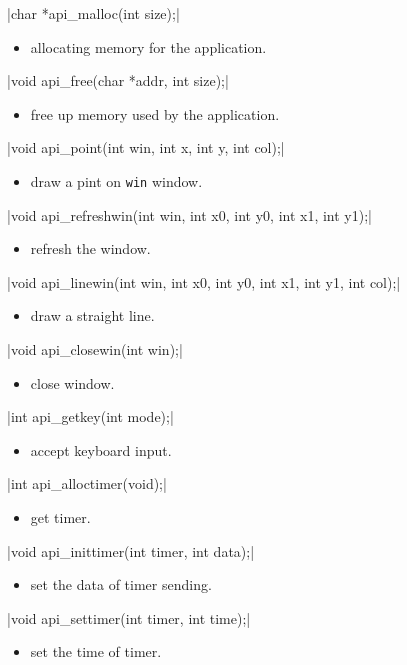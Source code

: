 \documentclass{swfcthesis}
\begin{document}
\csingle|char *api_malloc(int size);|
\begin{itemize}
\item allocating memory for the application.
\end{itemize}

\csingle|void api_free(char *addr, int size);|
\begin{itemize}
\item free up memory used by the application.
\end{itemize}

\csingle|void api_point(int win, int x, int y, int col);|
\begin{itemize}
\item draw a pint on \texttt{win} window.
\end{itemize}

\csingle|void api_refreshwin(int win, int x0, int y0, int x1, int y1);|
\begin{itemize}
\item refresh the window.
\end{itemize}

\csingle|void api_linewin(int win, int x0, int y0, int x1, int y1, int col);|
\begin{itemize}
\item draw a straight line.
\end{itemize}

\csingle|void api_closewin(int win);|
\begin{itemize}
\item close window.
\end{itemize}

\csingle|int api_getkey(int mode);|
\begin{itemize}
\item accept keyboard input.
\end{itemize}

\csingle|int api_alloctimer(void);|
\begin{itemize}
\item get timer.
\end{itemize}

\csingle|void api_inittimer(int timer, int data);|
\begin{itemize}
\item set the data of timer sending.
\end{itemize}

\csingle|void api_settimer(int timer, int time);|
\begin{itemize}
\item set the time of timer.
\end{itemize}
\end{document}
